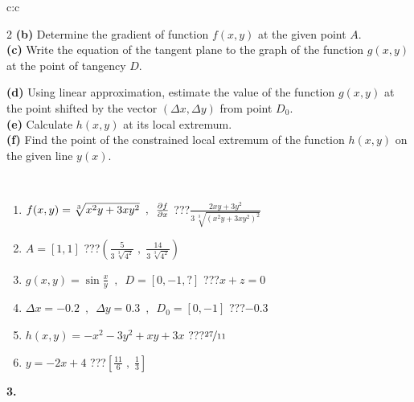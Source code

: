 \documentclass[10pt]{report}
\begin{document}
\begin{tabular}{c:c}
\begin{minipage}[c][104.5mm][t]{0.5\linewidth}
\begin{center}
\begin{minipage}{0.95\linewidth}
\begin{center}
{\begin{multicols}{2}
\textbf{(b)} Determine the gradient of function \(f(x,y)\) at the given point \(A\). \\[1mm]
\textbf{(c)} Write the equation of the tangent plane to the graph of the function \(g(x,y)\) at the point of tangency \(D\). \par \columnbreak
\textbf{(d)} Using linear approximation, estimate the value of the function \(g(x,y)\) at the point shifted by the vector \((\Delta x, \Delta y)\) from point \(D_0\). \\[1mm]
\textbf{(e)} Calculate \(h(x,y)\) at its local extremum. \\[1mm]
\textbf{(f)} Find the point of the constrained local extremum of the function \(h(x,y)\) on the given line \(y(x)\). \\[1mm]
\end{multicols}
}
\end{center}
\end{minipage}
\\[4mm]
\begin{minipage}{0.79\linewidth}
\begin{center}
\begin{varwidth}{\linewidth}
\begin{enumerate}
\normalsizerr
\item $f(x,y) = \sqrt[3]{x^2y + 3xy^2}\enspace , \enspace \pdv{f}{x}$\quad \dotfill\; ???\;\dotfill \quad $\frac{2xy+3y^2}{3\,\sqrt[3]{(x^2y+3xy^2)^{2}}}$
\item $A = [1, 1]$\quad \dotfill\; ???\;\dotfill \quad $\left( \frac{5}{3\,\sqrt[3]{4^2}} \;,\; \frac{14}{3\,\sqrt[3]{4^2}} \right)$
\item $g(x,y) = \sin\frac{x}{y} \enspace , \enspace D = [0, -1, ?]$\quad \dotfill\; ???\;\dotfill \quad $x+z=0$
\item $\Delta x = {-0.2} \enspace,\enspace \Delta y = {0.3} \enspace,\enspace D_0 = [0,-1]$\quad \dotfill\; ???\;\dotfill \quad $-0.3$
\item $h(x,y) = -x^2-3y^2+xy+3x$\quad \dotfill\; ???\;\dotfill \quad $\nicefrac{27}{11}$
\item $y = -2x+4$\quad \dotfill\; ???\;\dotfill \quad $\left[\frac{11}{6}\;,\;\frac{1}{3}\right]$
\end{enumerate}
\end{varwidth}
\end{center}
\end{minipage}
\begin{minipage}{0.20\linewidth}
\begin{center}
{\Huge\bfseries 3.} \\[2mm]

\end{center}
\end{minipage}
\end{center}
\end{minipage}
\end{tabular}
\end{document}
